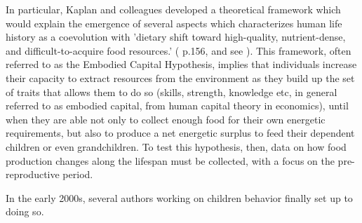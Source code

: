 In particular, Kaplan and colleagues developed a theoretical framework which would explain the emergence of several aspects which characterizes human life history as a coevolution with 'dietary shift toward high-quality, nutrient-dense, and difficult-to-acquire food resources.' (\cite{kaplan_theory_2000} p.156, and see \cite{kaplan_theory_1996, kaplan_evolution_1997, kaplan_embodied_2001, kaplan_emergence_2002, kaplan_embodied_2003, kaplan_neural_2003, kaplan_life_2006, kaplan_evolution_2007}). %
This framework, often referred to as the Embodied Capital Hypothesis, implies that individuals increase their capacity to extract resources from the environment as they build up the set of traits that allows them to do so (skills, strength, knowledge etc, in general referred to as embodied capital, from human capital theory in economics), until when they are able not only to collect enough food for their own energetic requirements, but also to produce a net energetic surplus to feed their dependent children or even grandchildren. To test this hypothesis, then, data on how food production changes along the lifespan must be collected, with a focus on the pre-reproductive period.

In the early 2000s, several authors working on children behavior finally set up to doing so. 

